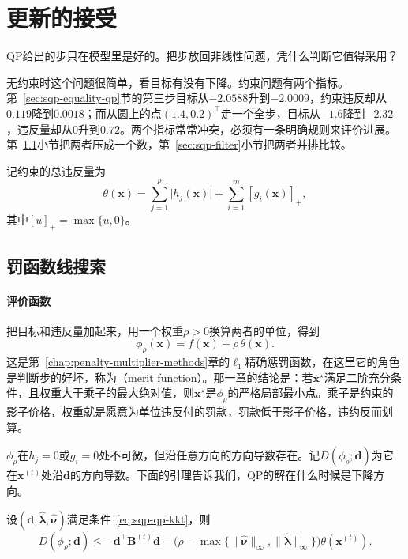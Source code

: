 \section{更新的接受}
\label{sec:sqp-acceptance}

QP给出的步只在模型里是好的。把步放回非线性问题，凭什么判断它值得采用？

无约束时这个问题很简单，看目标有没有下降。约束问题有两个指标。第~\ref{sec:sqp-equality-qp}节的第三步目标从$-2.0588$升到$-2.0009$，约束违反却从$0.119$降到$0.0018$；而从圆上的点$(1.4,0.2)^\top$走一个全步，目标从$-1.6$降到$-2.32$，违反量却从$0$升到$0.72$。两个指标常常冲突，必须有一条明确规则来评价进展。第~\ref{sec:sqp-merit}小节把两者压成一个数，第~\ref{sec:sqp-filter}小节把两者并排比较。

记约束的总违反量为
\begin{equation}
 \theta(\bm{x})=\sum_{j=1}^p\lvert h_j(\bm{x})\rvert+\sum_{i=1}^m[g_i(\bm{x})]_+,
 \label{eq:sqp-violation}
\end{equation}
其中$[u]_+=\max\{u,0\}$。

\subsection{罚函数线搜索}
\label{sec:sqp-merit}

\paragraph{评价函数}
把目标和违反量加起来，用一个权重$\rho>0$换算两者的单位，得到
\begin{equation}
 \phi_\rho(\bm{x})=f(\bm{x})+\rho\,\theta(\bm{x}).
 \label{eq:sqp-merit}
\end{equation}
这是第~\ref{chap:penalty-multiplier-methods}章的$\ell_1$精确惩罚函数，在这里它的角色是判断步的好坏，称为（merit function）。那一章的结论是：若$\bm{x}^\star$满足二阶充分条件，且权重大于乘子的最大绝对值，则$\bm{x}^\star$是$\phi_\rho$的严格局部最小点。乘子是约束的影子价格，权重就是愿意为单位违反付的罚款，罚款低于影子价格，违约反而划算。

$\phi_\rho$在$h_j=0$或$g_i=0$处不可微，但沿任意方向的方向导数存在。记$D(\phi_\rho;\bm{d})$为它在$\bm{x}^{(t)}$处沿$\bm{d}$的方向导数。下面的引理告诉我们，QP的解在什么时候是下降方向。

\begin{lemma}[QP步的下降性]
\label{lem:sqp-merit-descent}
设$(\bm{d},\hat{\bm{\lambda}},\hat{\bm{\nu}})$满足条件~\eqref{eq:sqp-qp-kkt}，则
\begin{equation}
 D(\phi_\rho;\bm{d})\leq-\bm{d}^\top\bm{B}^{(t)}\bm{d}-\bigl(\rho-\max\{\lVert\hat{\bm{\nu}}\rVert_\infty,\lVert\hat{\bm{\lambda}}\rVert_\infty\}\bigr)\theta(\bm{x}^{(t)}).
 \label{eq:sqp-merit-descent}
\end{equation}
\end{lemma}

